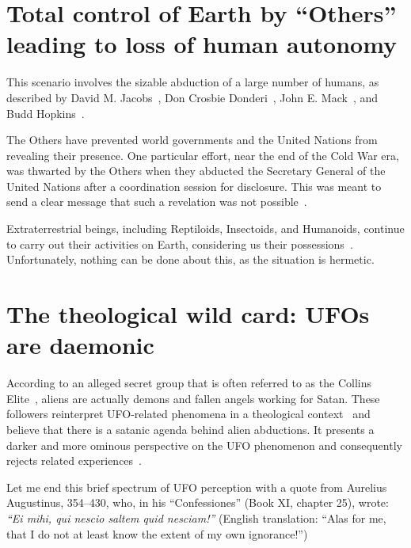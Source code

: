 \section{Total control of Earth by ``Others'' leading to loss of human autonomy}
\label{2023-UFO-part-Speculation-executive-summary-tl} %

This scenario involves the sizable abduction of a large number of humans, as described by David M. Jacobs~\cite{Jacobs1993Apr,Jacobs1999Mar,Jacobs2015Sep}, Don Crosbie Donderi~\cite{HJW1992,Donderi2013Mar,Donderi2013Jun},
John E. Mack~\cite{Mack-NYT1994Mar,Mack1994Apr,Mack1999PC}, and Budd Hopkins~\cite{Hopkins1981}.

The Others have prevented world governments and the United Nations from revealing their presence. One particular effort, near the end of the Cold War era, was thwarted by the Others when they abducted the Secretary General of the United Nations after a coordination session for disclosure. This was meant to send a clear message that such a revelation was not possible~\cite{hopkins-bbi}.

Extraterrestrial beings, including Reptiloids, Insectoids, and Humanoids, continue to carry out their activities on Earth, considering us their possessions~\cite{FortBotD}. Unfortunately, nothing can be done about this, as the situation is hermetic.



\section{The theological wild card: UFOs are daemonic}

According to an alleged secret group that is often referred to as the Collins Elite~\cite{Redfern2010Aug,Heiser2010Nov},
aliens are actually demons and fallen angels working for Satan.
These followers reinterpret UFO-related phenomena in a theological context~\cite{Kripal2011Nov,Pasulka2023Feb}
and believe that there is a satanic agenda behind alien abductions.
It presents a darker and more ominous perspective on the UFO phenomenon and consequently rejects related experiences~\cite[p.~219]{Pasulka2019Feb}.

Let me end this brief spectrum of UFO perception with a quote from Aurelius Augustinus, 354--430, who, in his ``Confessiones'' (Book XI, chapter 25), wrote:
{\em ``Ei mihi, qui nescio saltem quid nesciam!''}
(English translation: ``Alas for me, that I do not at least know the extent of my own ignorance!'')


